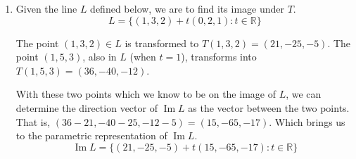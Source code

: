 \documentclass{article}
\newenvironment{answers}{ %
	\begin{enumerate}
		\setlength{\itemsep}{\bigskipamount}
}{\end{enumerate}}
\newcommand{\R}{\mathbb{R}}
\newcommand{\img}{\operatorname{Im}}
\begin{document}
\begin{answers}
\begin{enumerate}
			\item
				Given the line \(L\) defined below, we are to find its image under \(T\).
				\begin{equation*}
					L = \{(1,3,2) + t(0,2,1) : t \in \R\}
				\end{equation*}

				The point \((1,3,2) \in L\) is transformed to \(T(1,3,2) = (21, -25, -5)\). The point \((1,5,3)\), also in \(L\) (when \(t=1\)), transforms into \(T(1,5,3) = (36, -40, -12)\).

				With these two points which we know to be on the image of \(L\), we can determine the direction vector of \(\img L\) as the vector between the two points. That is, \((36-21, -40-25, -12-5) = (15, -65, -17)\). Which brings us to the parametric representation of \(\img L\).
				\begin{equation*}
					\img L = \{(21, -25, -5) + t(15, -65, -17) : t \in \R\}
				\end{equation*}
		\end{enumerate}
\end{answers}
\end{document}
